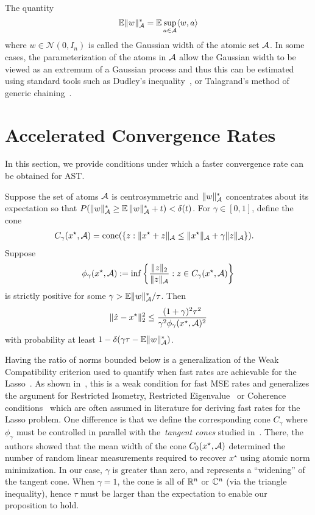 The quantity 
\[
	\operatorname{\mathbb{E}}\lVert w\rVert_{\mathcal{A}}^* = \operatorname{\mathbb{E}}\sup_{a \in \mathcal{A}} \langle w, a\rangle
\]
where $w \in \mathcal{N}(0,I_n)$ is called the Gaussian width of the atomic set
$\mathcal{A}$. In some cases, the parameterization of the atoms in $\mathcal{A}$ allow the
Gaussian width to be viewed as an extremum of a Gaussian process and thus this
can be estimated using standard tools such as Dudley's
inequality~\cite{ledoux2011probability}, or Talagrand's method of generic
chaining~\cite{talagrand05}.


\section{Accelerated Convergence Rates} %
\label{sec:convergence-rate}
In this section, we provide conditions under which a faster convergence rate
can be obtained for AST.
\begin{prop}
Suppose the set of atoms $\mathcal{A}$ is centrosymmetric and $\lVert w\rVert_{\mathcal{A}}^*$
concentrates about its expectation so that $P( {\lVert w\rVert_{\mathcal{A}}^*} \geq
\operatorname{\mathbb{E}}{\lVert w\rVert_{\mathcal{A}}^*}+t) < \delta(t)$. For $\gamma \in [0, 1]$, define the cone
\begin{align*}
C_\gamma(x^\star,\mathcal{A}) &= \operatorname{cone}(\{z:\lVert x^\star+ z\rVert_{\mathcal{A}} \leq \lVert x^\star\rVert_{\mathcal{A}} + \gamma\lVert z\rVert_{\mathcal{A}}\}).
\end{align*}
Suppose 
\begin{equation}
\label{eq:compatibility}
\phi_\gamma(x^\star,\mathcal{A}) := \inf \left\{ \frac{\lVert z\rVert_{2}}{\lVert z\rVert_{\mathcal{A}}}  : z \in C_\gamma(x^\star,\mathcal{A}) \right\} 
\end{equation}
is strictly positive for some $\gamma > {\operatorname{\mathbb{E}}\lVert w\rVert_{\mathcal{A}}^*}/{\tau}$. Then
\begin{equation}
\label{eq:fast_rate_phi}
\lVert\hat{x}-x^\star\rVert_2^2  \leq \frac{(1+\gamma)^2 \tau^2}{\gamma^2 \phi_\gamma(x^\star,\mathcal{A})^2}
\end{equation}
with probability at least $1-\delta(\gamma\tau - \operatorname{\mathbb{E}}\lVert w\rVert_{\mathcal{A}}^*)$.
\end{prop}

Having the ratio of norms bounded below is a generalization of the Weak
Compatibility criterion used to quantify when fast rates are achievable for the
Lasso~\cite{degeer}. As shown in~\cite{degeer}, this is a weak condition for
fast MSE rates and generalizes the argument for Restricted
Isometry\cite{candes06}, Restricted Eigenvalue~\cite{rest_eig} or Coherence
conditions~\cite{coherence} which are often assumed in literature for deriving
fast rates for the Lasso problem. One difference is that we define the
corresponding cone $C_\gamma$ where $\phi_\gamma$ must be controlled in parallel
with the~\emph{tangent cones} studied in~\cite{crpw}. There, the authors showed
that the mean width of the cone $C_0(x^\star,\mathcal{A})$ determined the number of
random linear measurements required to recover $x^\star$ using atomic norm
minimization. In our case, $\gamma$ is greater than zero, and represents a
``widening'' of the tangent cone. When $\gamma=1$, the cone is all of $\mathbb{R}^n$ or
$\mathbb{C}^n$ (via the triangle inequality), hence $\tau$ must be larger than the
expectation to enable our proposition to hold.

